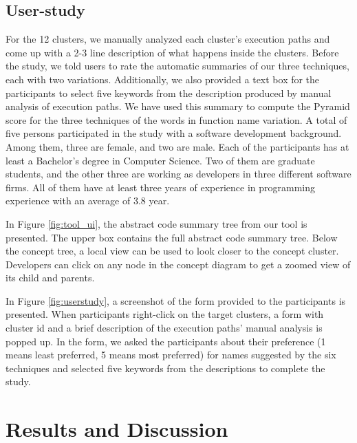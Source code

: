 \subsection{User-study}
For the 12 clusters, we manually analyzed each cluster's execution paths and come up with a 2-3 line description of what happens inside the clusters. Before the study, we told users to rate the automatic summaries of our three techniques, each with two variations. Additionally, we also provided a text box for the participants to select five keywords from the description produced by manual analysis of execution paths. We have used this summary to compute the Pyramid score for the three techniques of the words in function name variation. A total of five persons participated in the study with a software development background. Among them, three are female, and two are male. Each of the participants has at least a Bachelor's degree in Computer Science. Two of them are graduate students, and the other three are working as developers in three different software firms. All of them have at least three years of experience in programming experience with an average of 3.8 year. 


In Figure \ref{fig:tool_ui}, the abstract code summary tree from our tool is presented. The upper box contains the full abstract code summary tree. Below the concept tree, a local view can be used to look closer to the concept cluster. Developers can click on any node in the concept diagram to get a zoomed view of its child and parents. 

In Figure \ref{fig:userstudy}, a screenshot of the form provided to the participants is presented. When participants right-click on the target clusters, a form with cluster id and a brief description of the execution paths' manual analysis is popped up. In the form, we asked the participants about their preference (1 means least preferred, 5 means most preferred) for names suggested by the six techniques and selected five keywords from the descriptions to complete the study.




\section{Results and Discussion}
\label{results}

